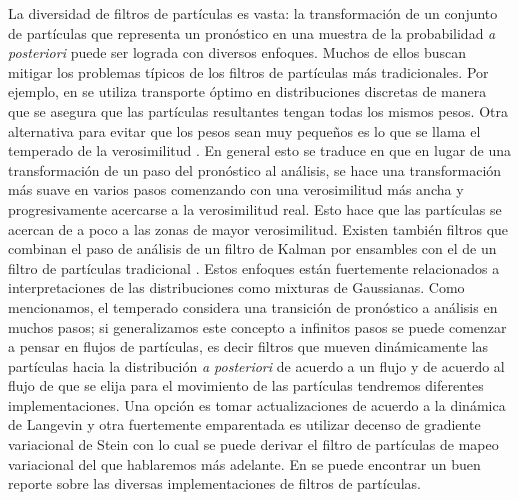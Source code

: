 La diversidad de filtros de partículas es vasta: la transformación de un conjunto de partículas que representa un pronóstico en una muestra de la probabilidad \textit{a posteriori} puede ser lograda con diversos enfoques. Muchos de ellos buscan mitigar los problemas típicos de los filtros de partículas más tradicionales. Por ejemplo, en \cite{Reich2013} se utiliza transporte óptimo en distribuciones discretas de manera que se asegura que las partículas resultantes tengan todas los mismos pesos. Otra alternativa para evitar que los pesos sean muy pequeños es lo que se llama el temperado de la verosimilitud \citep{Neal1996}. En general esto se traduce en que en lugar de una transformación de un paso del pronóstico al análisis, se hace una transformación más suave en varios pasos comenzando con una verosimilitud más ancha y progresivamente acercarse a la verosimilitud real. Esto hace que las partículas se acercan de a poco a las zonas de mayor verosimilitud. Existen también filtros que combinan el paso de análisis de un filtro de Kalman por ensambles con el de un filtro de partículas tradicional \citep{Stordal2011, Frei2013}. Estos enfoques están fuertemente relacionados a interpretaciones de las distribuciones como mixturas de Gaussianas. Como mencionamos, el temperado considera una transición de pronóstico a análisis en muchos pasos; si generalizamos este concepto a infinitos pasos se puede comenzar a pensar en flujos de partículas, es decir filtros que mueven dinámicamente las partículas hacia la distribución \textit{a posteriori} de acuerdo a un flujo y de acuerdo al flujo de que se elija para el movimiento de las partículas tendremos diferentes implementaciones. Una opción es tomar actualizaciones de acuerdo a la dinámica de Langevin \citep{Liu2017} y otra fuertemente emparentada es utilizar decenso de gradiente variacional de Stein \cite{Liu2016} con lo cual se puede derivar el filtro de partículas de mapeo variacional \citep{Pulido2019} del que hablaremos más adelante. En \cite{vanLeeuwen2019} se puede encontrar un buen reporte sobre las diversas implementaciones de filtros de partículas. 


